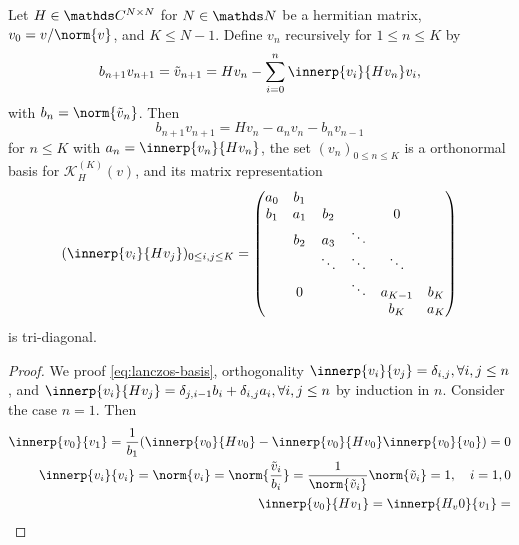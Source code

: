 \begin{lemma}
    Let \(H\in \C^{N\times N}\) for \(N\in\N\) be a hermitian matrix, \(v_0 = v / \norm{v}\), and \(K \leq N-1\).
    Define \(v_n\) recursively for \(1 \leq n \leq K\) by
    \begin{equation}\label{eq:lanczos-basis-def}
        b_{n+1}v_{n+1} = \tilde v_{n+1} = H v_n - \sum_{i=0}^n \innerp{v_i}{H v_n} v_i
        ,
    \end{equation}
    with \(b_n = \norm{\tilde v_n}\).
    Then
    \begin{equation}\label{eq:lanczos-basis}
        b_{n+1} v_{n+1} = H v_n - a_n v_n - b_n v_{n-1}
    \end{equation}
    for \(n\leq K\) with \(a_n = \innerp{v_n}{H v_n}\),
    the set \((v_n)_{0\leq n \leq K}\) is a orthonormal basis for \(\mathcal{K}^{(K)}_H(v)\), and its matrix representation
    \begin{equation}
        (\innerp{v_i}{H v_j})_{0 \leq i,j \leq K} = 
        \begin{pmatrix}
            a_0 & b_1 &        &        &         &    \\
            b_1 & a_1 & b_2    &        &   0     &    \\
                & b_2 & a_3    & \ddots &         &    \\
                &     & \ddots & \ddots & \ddots  &    \\
                & 0   &        & \ddots & a_{K-1} & b_K\\
                &     &        &        & b_K     & a_{K}
        \end{pmatrix}
    \end{equation}
    is tri-diagonal.
\end{lemma}
\begin{proof}
    We proof \cref{eq:lanczos-basis}, orthogonality \(\innerp{v_i}{v_j} = \delta_{i,j}, \forall i,j \leq n\), and \(\innerp{v_i}{H v_j} = \delta_{j, i-1} b_i + \delta_{i,j} a_i, \forall i,j \leq n\) by induction in \(n\).
    Consider the case \(n=1\).
    Then 
    \begin{align}
        \innerp{v_0}{v_1} = \frac{1}{b_1} \of*{ \innerp{v_0}{H v_0} - \innerp{v_0}{H v_0} \innerp{v_0}{v_0} } = 0
        \\
        \innerp{v_i}{v_i} = \norm{v_i} = \norm{\frac{\tilde v_i}{b_i}} = \frac{1}{\norm{\tilde v_i}}\norm{\tilde v_i} = 1, \quad i = 1,0
        \\
        \innerp{v_0}{H v_1} = \innerp{H_v 0}{v_1} = 
    \end{align}
\end{proof}


